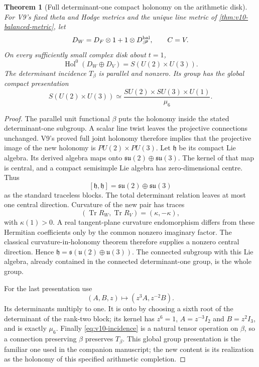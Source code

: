 \documentclass[11pt]{article}
\newtheorem{theorem}{Theorem}[section]
\theoremstyle{definition}
\theoremstyle{remark}
\newcommand{\Tr}{\operatorname{Tr}}
\begin{document}
\begin{theorem}[Full determinant-one compact holonomy on the arithmetic disk]
\label{thm:v10-SU}
For V9's fixed theta and Hodge metrics and the unique line metric of
\cref{thm:v10-balanced-metric}, let
\[
 D_W=D_F\otimes1+1\otimes D_{\mathscr P}^{\rm bal},\qquad C=V.
\]
On every sufficiently small complex disk about $t=1$,
\begin{equation}
 \boxed{\operatorname{Hol}^{0}(D_W\oplus D_V)
       =S(U(2)\times U(3)).}
 \label{eq:v10-SU}
\end{equation}
The determinant incidence $T_\beta$ is parallel and nonzero. Its group
has the global compact presentation
\begin{equation}
 \boxed{S(U(2)\times U(3))\simeq
 \frac{SU(2)\times SU(3)\times U(1)}{\mu_6}.}
 \label{eq:v10-Z6}
\end{equation}
\end{theorem}
\begin{proof}
The parallel unit functional $\beta$ puts the holonomy inside the stated
determinant-one subgroup. A scalar line twist leaves the projective
connections unchanged. V9's proved full joint holonomy therefore implies
that the projective image of the new holonomy is
$PU(2)\times PU(3)$. Let $\mathfrak h$ be its compact Lie algebra.
Its derived algebra maps onto
$\mathfrak{su}(2)\oplus\mathfrak{su}(3)$. The kernel of that map is
central, and a compact semisimple Lie algebra has zero-dimensional centre.
Thus
\[
 [\mathfrak h,\mathfrak h]=\mathfrak{su}(2)\oplus\mathfrak{su}(3)
\]
as the standard traceless blocks. The total determinant relation leaves
at most one central direction. Curvature of the new pair has traces
\[
 (\Tr R_W,\Tr R_V)=(\kappa,-\kappa),
\]
with $\kappa(1)>0$. A real tangent-plane curvature endomorphism differs
from these Hermitian coefficients only by the common nonzero imaginary
factor. The classical curvature-in-holonomy theorem \cite{AmbroseSinger}
therefore supplies a nonzero central direction. Hence
$\mathfrak h=\mathfrak s(\mathfrak u(2)\oplus\mathfrak u(3))$.
The connected subgroup with this Lie algebra, already contained in the
connected determinant-one group, is the whole group.

For the last presentation use
\[
 (A,B,z)\longmapsto(z^3A,z^{-2}B).
\]
Its determinants multiply to one. It is onto by choosing a sixth root of
the determinant of the rank-two block; its kernel has $z^6=1$,
$A=z^{-3}I_2$ and $B=z^2I_3$, and is exactly $\mu_6$.
Finally \cref{eq:v10-incidence} is a natural tensor operation on
$\beta$, so a connection preserving $\beta$ preserves $T_\beta$.
This global group presentation is the familiar one used in the companion
manuscript; the new content is its realization as the holonomy of this
specified arithmetic completion.
\end{proof}
\end{document}
